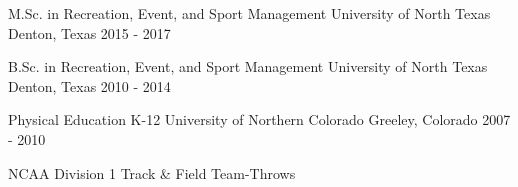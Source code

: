 

\begin{cventries}

  \cventry
    {M.Sc. in Recreation, Event, and Sport Management} %
    {University of North Texas} %
    {Denton, Texas} %
    {2015 - 2017} %
    {
      \begin{cvitems} %
      \end{cvitems}
    }

  \cventry
    {B.Sc. in Recreation, Event, and Sport Management} %
    {University of North Texas} %
    {Denton, Texas} %
    {2010 - 2014} %
    {
      \begin{cvitems} %
      \end{cvitems}
    }

  \cventry
    {Physical Education K-12} %
    {University of Northern Colorado} %
    {Greeley, Colorado} %
    {2007 - 2010} %
    {
      \begin{cvitems} %
        \item {NCAA Division 1 Track \& Field Team-Throws}
      \end{cvitems}
    }
    
\end{cventries}

